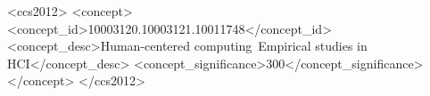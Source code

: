 \documentclass[sigchi, review]{acmart}
\begin{document}
%
%
\begin{CCSXML}
<ccs2012>
<concept>
<concept_id>10003120.10003121.10011748</concept_id>
<concept_desc>Human-centered computing~Empirical studies in HCI</concept_desc>
<concept_significance>300</concept_significance>
</concept>
</ccs2012>
\end{CCSXML}




\maketitle













%



\end{document}
